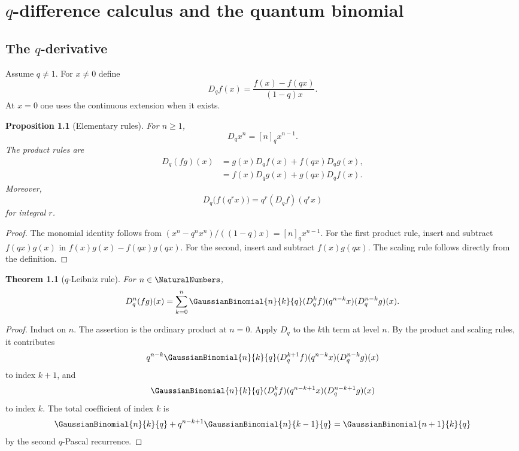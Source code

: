 \documentclass[11pt,a4paper,oneside,openany]{book}
\newtheorem{theorem}{Theorem}[chapter]
\newtheorem{proposition}[proposition]{Proposition}
\theoremstyle{definition}
\theoremstyle{remark}
\begin{document}
\chapter{\texorpdfstring{$q$}{q}-difference calculus and the quantum binomial}\label{chap:qcalculus}

\section{The \texorpdfstring{$q$}{q}-derivative}

Assume $q\ne1$.  For $x\ne0$ define
\[
 D_qf(x)=\frac{f(x)-f(qx)}{(1-q)x}.
\]
At $x=0$ one uses the continuous extension when it exists.

\begin{proposition}[Elementary rules]\label{prop:qderivative-rules}
For $n\ge1$,
\[
 D_qx^n=[n]_qx^{n-1}.
\]
The product rules are
\begin{align*}
 D_q(fg)(x)&=g(x)D_qf(x)+f(qx)D_qg(x),\\
 &=f(x)D_qg(x)+g(qx)D_qf(x).
\end{align*}
Moreover,
\[
 D_q\bigl(f(q^rx)\bigr)=q^r(D_qf)(q^rx)
\]
for integral $r$.
\end{proposition}

\begin{proof}
The monomial identity follows from
\(
 (x^n-q^nx^n)/((1-q)x)=[n]_qx^{n-1}.
\)
For the first product rule, insert and subtract $f(qx)g(x)$ in
\(
 f(x)g(x)-f(qx)g(qx).
\)
For the second, insert and subtract $f(x)g(qx)$.  The scaling rule follows directly from the definition.
\end{proof}

\begin{theorem}[$q$-Leibniz rule]\label{thm:q-leibniz}
For $n\in\NaturalNumbers$,
\[
 D_q^n(fg)(x)
 =\sum_{k=0}^{n}\GaussianBinomial{n}{k}{q}
 (D_q^kf)(q^{n-k}x)(D_q^{n-k}g)(x).
\]
\end{theorem}

\begin{proof}
Induct on $n$.  The assertion is the ordinary product at $n=0$.  Apply $D_q$ to the $k$th term at level $n$.  By the product and scaling rules, it contributes
\[
 q^{n-k}\GaussianBinomial{n}{k}{q}
 (D_q^{k+1}f)(q^{n-k}x)(D_q^{n-k}g)(x)
\]
to index $k+1$, and
\[
 \GaussianBinomial{n}{k}{q}(D_q^kf)(q^{n-k+1}x)(D_q^{n-k+1}g)(x)
\]
to index $k$.  The total coefficient of index $k$ is
\[
 \GaussianBinomial{n}{k}{q}+q^{n-k+1}\GaussianBinomial{n}{k-1}{q}
 =\GaussianBinomial{n+1}{k}{q}
\]
by the second $q$-Pascal recurrence.
\end{proof}
\end{document}
